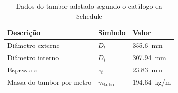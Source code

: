 \begin{table}[H]
  \centering
  \caption{Dados do tambor adotado segundo o catálogo da Schedule}
  \label{tab:dados_do_tambor_adotado}
  \begin{tabularx}{\textwidth}{>{\centering\arraybackslash}X>{\centering\arraybackslash}X>{\centering\arraybackslash}X}
    \toprule
    Descrição                 & Símbolo           & Valor                            \\
    \midrule
    Diâmetro externo          & $D_t$             & \SI{355.6}{\milli\meter}       \\
    Diâmetro interno          & $D_i$             & \SI{307.94}{\milli\meter}      \\
    Espessura                 & $e_t$             & \SI{23.83}{\milli\meter}       \\
    Massa do tambor por metro & $m_{\text{tubo}}$ & \SI{194.64}{\kilo\gram/\meter} \\
    \bottomrule
  \end{tabularx}
\end{table}
